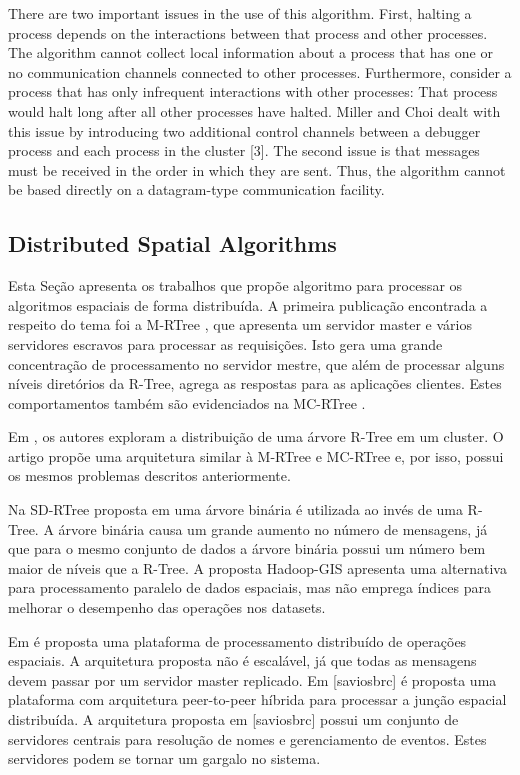 	There are two important issues in the use of this algorithm. First, halting a process depends on the interactions between that process and other processes. The algorithm cannot collect local information about a process that has one or no communication channels connected to other processes. Furthermore, consider a process that has only infrequent interactions with other processes: That process would halt long after all other processes have halted. Miller and Choi dealt with this issue by introducing two additional control channels between a debugger process and each process in the cluster [3]. The second issue is that messages must be received in the order in which they are sent. Thus, the algorithm cannot be based directly on a datagram-type communication facility.	
	
\subsection{Distributed Spatial Algorithms}
\label{spatialdist}

Esta Seção apresenta os trabalhos que propõe algoritmo para processar os algoritmos espaciais de forma distribuída.
A primeira publicação encontrada a respeito do tema foi a M-RTree \cite{koudas1996declustering}, que apresenta um servidor master e vários servidores escravos para processar as requisições. Isto gera uma grande concentração
de processamento no servidor mestre, que além de processar alguns níveis diretórios da R-Tree, agrega as respostas para
as aplicações clientes. Estes comportamentos também são evidenciados na MC-RTree \cite{schnitzer1999master}.

Em \cite{an1999storing}, os autores exploram a distribuição de uma árvore R-Tree em
um cluster. O artigo propõe uma arquitetura similar à M-RTree e MC-RTree e, por isso,
possui os mesmos problemas descritos anteriormente.

Na SD-RTree proposta em \cite{du2007sd} uma árvore binária é utilizada ao invés de uma R-Tree.
A árvore binária causa um grande aumento no número de mensagens, já que para o mesmo conjunto de dados a árvore binária possui um número bem maior de níveis que a R-Tree. A proposta Hadoop-GIS \cite{kerr2009alternative} apresenta uma alternativa para processamento paralelo de dados espaciais, mas não emprega índices para melhorar o desempenho das operações nos datasets.

Em \cite{dedsi} é proposta uma plataforma de processamento distribuído de operações espaciais. A arquitetura proposta não é escalável, já que todas as mensagens devem passar por um servidor master replicado. Em [saviosbrc] é proposta uma plataforma com arquitetura peer-to-peer híbrida para processar a junção espacial distribuída. A arquitetura proposta em [saviosbrc] possui um conjunto de servidores centrais para resolução de nomes e gerenciamento de eventos. Estes servidores podem se tornar um gargalo no sistema.

